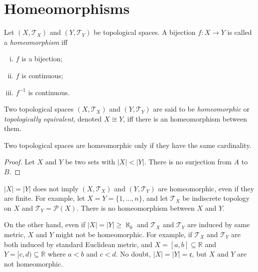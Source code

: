 \section{Homeomorphisms}


\begin{definition}
	[homeomorphisms]
	\label{def: homomorphisms}
	Let $(X, \mathcal T_X)$ and $(Y, \mathcal T_Y)$ be topological spaces. A bijection $f: X \to Y$ is called a \textit{homeomorphism} iff
	\begin{enumerate}[(i)]
		\item $f$ is a bijection;
		\item $f$ is continuous;
		\item $f^{-1}$ is continuous.
	\end{enumerate}
\end{definition}


\begin{definition}
	[homeomorphic]
	\label{def: homomorphic}
	Two topological spaces $(X, \mathcal T_X)$ and $(Y, \mathcal T_Y)$ are said to be \textit{homeomorphic} or \textit{topologically equivalent}, denoted $X \cong Y$, iff there is an homeomorphism between them.
\end{definition}


\begin{proposition}
	Two topological spaces are homeomorphic only if they have the same cardinality.
	
	\begin{proof}
		Let $X$ and $Y$ be two sets with $|X| < |Y|$. There is no surjection from $A$ to $B$.
	\end{proof}
\end{proposition}


\begin{example}
	$|X| = |Y|$ does not imply $(X, \mathcal T_X)$ and $(Y, \mathcal T_Y)$ are homeomorphic, even if they are finite. For example, let $X = Y = \{1, \ldots, n\}$, and let $\mathcal T_X$ be indiscrete topology on $X$ and $\mathcal T_Y = \mathcal P(X)$. There is no homeomorphism between $X$ and $Y$.
	
	On the other hand, even if $|X| = |Y| \ge \aleph_0$ and $\mathcal T_X$ and $\mathcal T_Y$ are induced by same metric, $X$ and $Y$ might not be homeomorphic. For example, if $\mathcal T_X$ and $\mathcal T_Y$ are both induced by standard Euclidean metric, and $X = [a, b] \subseteq \mathbb R$ and $Y = [c, d) \subseteq \mathbb R$ where $a < b$ and $c < d$. No doubt, $|X| = |Y| = \mathfrak c$, but $X$ and $Y$ are not homeomorphic.
\end{example}


